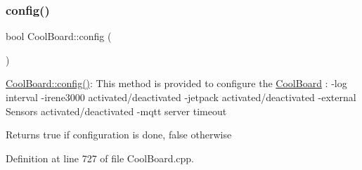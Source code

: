 \mbox{\label{class_cool_board_a583a874c09c07e70a6eb9229fc4beddb}} 
\subsubsection{\texorpdfstring{config()}{config()}}
{\footnotesize\ttfamily bool Cool\+Board\+::config (\begin{DoxyParamCaption}{ }\end{DoxyParamCaption})}

\hyperlink{class_cool_board_a583a874c09c07e70a6eb9229fc4beddb}{Cool\+Board\+::config()}\+: This method is provided to configure the \hyperlink{class_cool_board}{Cool\+Board} \+: -\/log interval -\/irene3000 activated/deactivated -\/jetpack activated/deactivated -\/external Sensors activated/deactivated -\/mqtt server timeout

\begin{DoxyReturn}{Returns}
true if configuration is done, false otherwise 
\end{DoxyReturn}


Definition at line 727 of file Cool\+Board.\+cpp.


